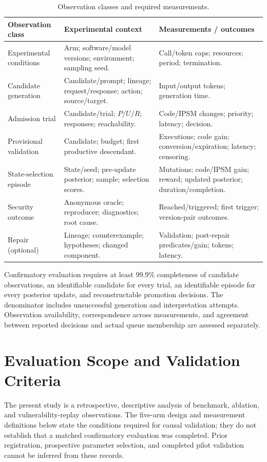 \documentclass[final,5p,times,number]{elsarticle}
\begin{document}
\begin{table}[!tbp]
\centering\footnotesize
\caption{Observation classes and required measurements.}
\label{tab:events}
\begin{tabularx}{\textwidth}{@{}>{\raggedright\arraybackslash}p{} Y Y@{}}
\toprule
Observation class & Experimental context & Measurements / outcomes \\
\midrule
Experimental conditions & Arm; software/model versions; environment; sampling seed. & Call/token caps; resources; period; termination. \\
Candidate generation & Candidate/prompt; lineage; request/response; action; source/target. & Input/output tokens; generation time. \\
Admission trial & Candidate/trial; $P/U/R$; responses; reachability. & Code/IPSM changes; priority; latency; decision. \\
Provisional validation & Candidate; budget; first productive descendant. & Executions; code gain; conversion/expiration; latency; censoring. \\
State-selection episode & State/seed; pre-update posterior; sample; selection scores. & Mutations; code/IPSM gain; reward; updated posterior; duration/completion. \\
Security outcome & Anonymous oracle; reproducer; diagnostics; root cause. & Reached/triggered; first trigger; version-pair outcomes. \\
Repair (optional) & Lineage; counterexample; hypotheses; changed component. & Validation; post-repair predicates/gain; tokens; latency. \\
\bottomrule
\end{tabularx}
\end{table}

Confirmatory evaluation requires at least 99.9\% completeness of candidate observations, an identifiable candidate for every trial, an identifiable episode for every posterior update, and reconstructable promotion decisions. The denominator includes unsuccessful generation and interpretation attempts. Observation availability, correspondence across measurements, and agreement between reported decisions and actual queue membership are assessed separately.

\section{Evaluation Scope and Validation Criteria}
\label{sec:protocol}
The present study is a retrospective, descriptive analysis of benchmark, ablation, and vulnerability-replay observations. The five-arm design and measurement definitions below state the conditions required for causal validation; they do not establish that a matched confirmatory evaluation was completed. Prior registration, prospective parameter selection, and completed pilot validation cannot be inferred from these records.
\end{document}
